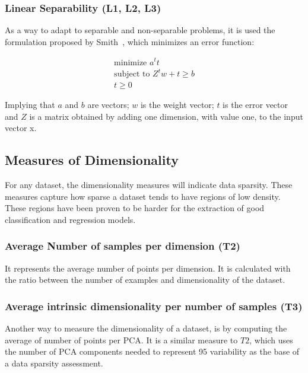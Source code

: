 \subsubsection{Linear Separability (L1, L2, L3)}

As a way to adapt to separable and non-separable problems, it is used the 
formulation proposed by Smith~\cite{FWSmith}, which minimizes an error function:

\begin{align*} 
 \text{minimize } a^{t}t \\
 \text{subject to } Z^{t}w + t \geq b \\
 t \geq 0 
\end{align*}

Implying that $a$ and $b$ are vectors; $w$ is the weight vector; $t$ is the 
error vector and $Z$ is a matrix obtained by adding one dimension, with value 
one, to the input vector x.

\subsection{Measures of Dimensionality}\label{sec:dimensionality}

For any dataset, the dimensionality measures will indicate data sparsity.
These measures capture how sparse a dataset tends to have regions of low 
density. These regions have been proven to be harder for the extraction of 
good classification and regression models.

\subsubsection{Average Number of samples per dimension (T2)}

It represents the average number of points per dimension. It is calculated with 
the ratio between the number of examples and dimensionality of the dataset.

\subsubsection{Average intrinsic dimensionality per number of samples (T3)}

Another way to measure the dimensionality of a dataset, is by computing the 
average of number of points per PCA. It is a similar measure to $T2$, which
uses the number of PCA components needed to represent 95 variability as
the base of a data sparsity assessment.

